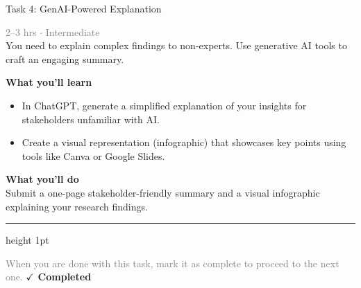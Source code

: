 \documentclass[10pt,a4paper]{article}
\begin{document}
\begin{taskbox}{Task 4: GenAI-Powered Explanation}

    {\small \textcolor{gray}{2--3 hrs $\cdot$ Intermediate}}\\[12pt]

      
You need to explain complex findings to non-experts. Use generative AI tools to craft an engaging summary.  


\vspace{8pt}
{\large \textbf{\textcolor{brandLight}{What you'll learn}}}\\[4pt]  
\begin{itemize}
    \item In ChatGPT, generate a simplified explanation of your insights for stakeholders unfamiliar with AI.  
    \item Create a visual representation (infographic) that showcases key points using tools like Canva or Google Slides.  
\end{itemize}

\vspace{8pt}
{\large \textbf{\textcolor{brandLight}{What you'll do}}}\\[4pt]  
Submit a one-page stakeholder-friendly summary and a visual infographic explaining your research findings.\par

    \vspace{16pt}

    \textcolor{cardBorder}{\hrule height 1pt}\vspace{8pt}

    \small \textcolor{gray}{When you are done with this task, mark it as complete to proceed to the next one.} \hfill \textbf{\textcolor{brandDark}{$\checkmark$ Completed}}

\end{taskbox}
\end{document}
